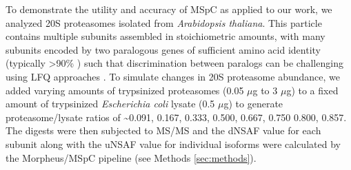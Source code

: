 To demonstrate the utility and accuracy of MSpC as applied to our work, we analyzed 20S proteasomes isolated from \textit{Arabidopsis thaliana}.
This particle contains multiple subunits assembled in stoichiometric amounts, with many subunits encoded by two paralogous genes of sufficient amino acid identity (typically >90\% \citep{yang04}) such that discrimination between paralogs can be challenging using LFQ approaches \citep{book10}.
To simulate changes in 20S proteasome abundance, we added varying amounts of trypsinized proteasomes (0.05 $\mu$g to 3 $\mu$g) to a fixed amount of trypsinized \textit{Escherichia coli} lysate (0.5 $\mu$g) to generate proteasome/lysate ratios of \textasciitilde0.091, 0.167, 0.333, 0.500, 0.667, 0.750 0.800, 0.857.
The digests were then subjected to MS/MS and the dNSAF value for each subunit along with the uNSAF value for individual isoforms were calculated by the Morpheus/MSpC pipeline (see Methods \ref{sec:methods}).
